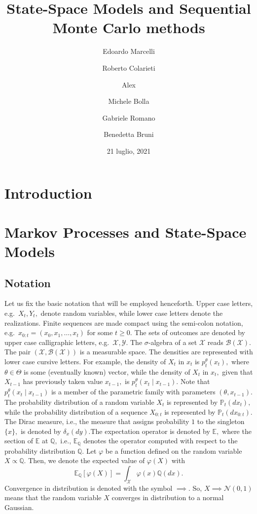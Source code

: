 \documentclass[
]{book}
\title{\Huge State-Space Models and Sequential Monte Carlo methods}
\author{Edoardo Marcelli \and Roberto Colarieti \and Alex \and Michele
Bolla \and Gabriele Romano \and Benedetta Bruni}
\date{21 luglio, 2021}
\theoremstyle{break}
\theoremstyle{nonumberplain}
\begin{document}
\frontmatter
\maketitle

\mainmatter
\chapter*{Introduction}

\chapter{Markov Processes and State-Space Models}

\section{Notation}

Let us fix the basic notation that will be employed henceforth. Upper
case letters, e.g.~\(X_t, Y_t,\) denote random variables, while lower
case letters denote the realizations. Finite sequences are made compact
using the semi-colon notation, e.g.~\(x_{0:t}=(x_0, x_1, \dots, x_t)\)
for some \(t \geq 0.\) The sets of outcomes are denoted by upper case
calligraphic letters, e.g.~\(\mathcal{X}, \mathcal{Y}.\) The
\(\sigma\)-algebra of a set \(\mathcal{X}\) reads
\(\mathcal{B}(\mathcal{X}).\) The pair
\((\mathcal{X}, \mathcal{B}(\mathcal{X}))\) is a measurable space. The
densities are represented with lower case cursive letters. For example,
the density of \(X_t\) in \(x_t\) is \(p_t^\theta(x_t),\) where
\(\theta\in\Theta\) is some (eventually known) vector, while the density
of \(X_t\) in \(x_t,\) given that \(X_{t-1}\) has previously taken value
\(x_{t-1},\) is \(p_t^\theta(x_t\mid x_{t-1}).\) Note that
\(p_t^\theta(x_t\mid x_{t-1})\) is a member of the parametric family
with parameters \((\theta, x_{t-1})\). The probability distribution of a
random variable \(X_t\) is represented by \(\mathbb{P}_t(dx_t),\) while
the probability distribution of a sequence \(X_{0:t}\) is represented by
\(\mathbb{P}_t(dx_{0:t}).\) The Dirac measure, i.e., the measure that
assigns probability \(1\) to the singleton \(\{x\},\) is denoted by
\(\delta_x(dy)\).The expectation operator is denoted by \(\mathbb{E},\)
where the section of \(\mathbb{E}\) at \(\mathbb{Q},\) i.e.,
\(\mathbb{E}_{\mathbb{Q}}\) denotes the operator computed with respect
to the probability distribution \(\mathbb{Q}.\) Let \(\varphi\) be a
function defined on the random variable \(X\propto\mathbb{Q}.\) Then, we
denote the expected value of \(\varphi(X)\) with \[
    \mathbb{E}_{\mathbb{Q}}[\varphi(X)]=
    \int_{\mathcal{X}}\varphi(x)\mathbb{Q}(dx).
\] Convergence in distribution is denoted with the symbol \(\implies.\)
So, \(X\implies\mathcal N(0,1)\) means that the random variable \(X\)
converges in distribution to a normal Gaussian.
\end{document}
